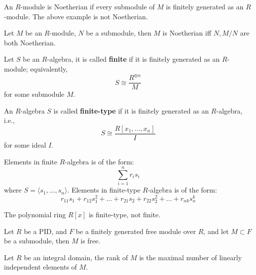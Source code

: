 \documentclass[openany]{book}
\newcommand{\la}{\langle}
\newcommand{\ra}{\rangle}
\begin{document}
\begin{defn}
    An $R$-module is Noetherian if every submodule of $M$ is finitely generated as an $R$-module. The above example is not Noetherian.
\end{defn}


\begin{prop}
    Let $M$ be an $R$-module, $N$ be a submodule, then $M$ is Noetherian iff $N,M/N$ are both Noetherian.
\end{prop}

\begin{defn}
    Let $S$ be an $R$-algebra, it is called \textbf{finite} if it is finitely generated as an $R$-module; equivalently, 
    \begin{equation*}
        S\cong\frac{R^{\oplus n}}{M}
    \end{equation*}
    for some submodule $M$. 

    An $R$-algebra $S$ is called \textbf{finite-type} if it is finitely generated as an $R$-algebra, i.e., 
    \begin{equation*}
        S\cong\frac{R[x_1,\dots, x_n]}{I}
    \end{equation*}
    for some ideal $I$.
\end{defn}
Elements in finite $R$-algebra is of the form:
\begin{equation*}
    \sum_{i=1}^nr_is_i
\end{equation*}
where $S=\la s_1,\dots, s_n\ra$. Elements in finite-type $R$-algebra is of the form:
\begin{equation*}
    r_{11}s_1+r_{12}s_1^2+\dots+r_{21}s_2+r_{22}s_2^2+\dots+r_{nk}s_n^k
\end{equation*}


\begin{prop}
    The polynomial ring $R[x]$ is finite-type, not finite.
\end{prop}


\begin{prop}
    Let $R$ be a PID, and $F$ be a finitely generated free module over $R$, and let $M\subset F$ be a submodule, then $M$ is free.
\end{prop}


\begin{defn}
    Let $R$ be an integral domain, the rank of $M$ is the maximal number of linearly independent elements of $M$.
\end{defn}
\end{document}
